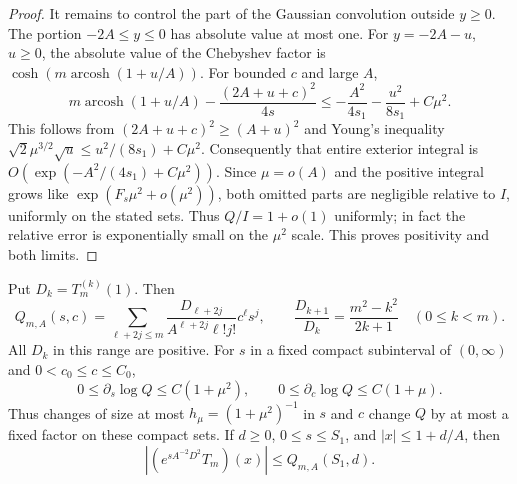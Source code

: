 \begin{proof}
It remains to control the part of the Gaussian convolution outside
$y\ge0$.  The portion $-2A\le y\le0$ has absolute value at most one.
For $y=-2A-u$, $u\ge0$, the absolute value of the Chebyshev factor is
$\cosh(m\operatorname{arcosh}(1+u/A))$.  For bounded $c$ and large $A$,
\[
 m\operatorname{arcosh}(1+u/A)-\frac{(2A+u+c)^2}{4s}
 \le -\frac{A^2}{4s_1}-\frac{u^2}{8s_1}+C\mu^2.
\]
This follows from $(2A+u+c)^2\ge(A+u)^2$ and Young's inequality
$\sqrt2\mu^{3/2}\sqrt u\le u^2/(8s_1)+C\mu^2$.
Consequently that entire exterior integral is
$O(\exp(-A^2/(4s_1)+C\mu^2))$.
Since $\mu=o(A)$ and the positive integral grows like
$\exp(F_s\mu^2+o(\mu^2))$, both omitted parts are negligible relative
to $I$, uniformly on the stated sets.  Thus $Q/I=1+o(1)$ uniformly;
in fact the relative error is exponentially small on the $\mu^2$ scale.
This proves positivity and both limits.
\end{proof}

\begin{lemma}\label{lem:heat-terminal}
Put $D_k=T_m^{(k)}(1)$.  Then
\begin{equation}\label{eq:heat-positive-series}
 Q_{m,A}(s,c)=\sum_{\ell+2j\le m}
 \frac{D_{\ell+2j}}{A^{\ell+2j}\ell!j!}c^\ell s^j,
 \qquad
 \frac{D_{k+1}}{D_k}=\frac{m^2-k^2}{2k+1}\quad(0\le k<m).
\end{equation}
All $D_k$ in this range are positive.  For $s$ in a fixed compact
subinterval of $(0,\infty)$ and $0<c_0\le c\le C_0$,
\begin{equation}\label{eq:heat-log-derivatives}
 0\le\partial_s\log Q\le C(1+\mu^2),\qquad
 0\le\partial_c\log Q\le C(1+\mu).
\end{equation}
Thus changes of size at most $h_\mu=(1+\mu^2)^{-1}$ in $s$ and $c$
change $Q$ by at most a fixed factor on these compact sets.
If $d\ge0$, $0\le s\le S_1$, and $|x|\le1+d/A$, then
\begin{equation}\label{eq:heat-global-majorant}
 \left|\left(e^{sA^{-2}D^2}T_m\right)(x)\right|
 \le Q_{m,A}(S_1,d).
\end{equation}
\end{lemma}

